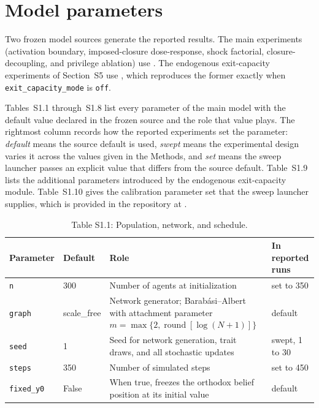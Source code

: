\documentclass[12pt]{article}
\begin{document}
\section{Model parameters}
\label{sec:params}

Two frozen model sources generate the reported results. The main experiments
(activation boundary, imposed-closure dose-response, shock factorial,
closure-decoupling, and privilege ablation) use
. The endogenous exit-capacity
experiments of Section~S5 use ,
which reproduces the former exactly when \texttt{exit\_capacity\_mode} is
\texttt{off}.

Tables~S1.1 through~S1.8 list every parameter of the main model with the
default value declared in the frozen source and the role that value plays.
The rightmost column records how the reported experiments set the parameter:
\emph{default} means the source default is used, \emph{swept} means the
experimental design varies it across the values given in the Methods, and
\emph{set} means the sweep launcher passes an explicit value that differs from
the source default. Table~S1.9 lists the additional parameters introduced by
the endogenous exit-capacity module. Table~S1.10 gives the calibration parameter
set that the sweep launcher supplies, which is provided in the repository at
.

\begin{table}[htbp]
\centering
\footnotesize
\caption{Table S1.1: Population, network, and schedule.}
\begin{tabular}{p{4.9cm}p{1.3cm}p{4.5cm}p{2.4cm}}
\toprule
Parameter & Default & Role & In reported runs \\
\midrule
\texttt{n} & 300 & Number of agents at initialization & set to 350 \\
\texttt{graph} & scale\_free & Network generator; Barab\'asi--Albert with attachment parameter $m=\max\{2,\operatorname{round}[\log(N+1)]\}$ & default \\
\texttt{seed} & 1 & Seed for network generation, trait draws, and all stochastic updates & swept, 1 to 30 \\
\texttt{steps} & 350 & Number of simulated steps & set to 450 \\
\texttt{fixed\_y0} & False & When true, freezes the orthodox belief position at its initial value & default \\
\bottomrule
\end{tabular}
\end{table}
\end{document}
